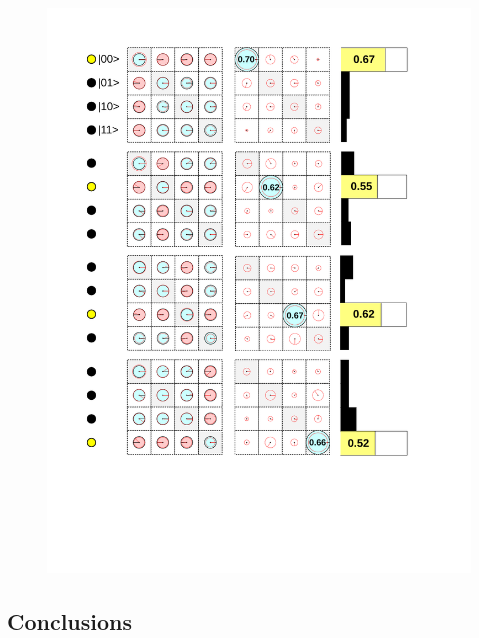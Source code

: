 \begin{figure}
	\centering
		\includegraphics[width=1.\textwidth]{./material/papers/grover/figures/grover_algorithm_experimental_results}
	\label{fig:GroverAlgorithmExperimentalResults}
	\caption{}
\end{figure}

\subsection{Conclusions}

